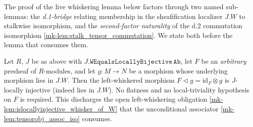 The proof of the live whiskering lemma below factors through two named
sub-lemmas: the \emph{d.1-bridge} relating membership in the sheafification
localizer \(J.W\) to stalkwise isomorphism, and the \emph{second-factor
naturality} of the d.2 commutation isomorphism \ref{mk-lem:stalk_tensor_commutation}.
We state both before the lemma that consumes them.

\begin{lemma}\label{mk-lem:islocallyinjective_whiskerleft_via_stalk}
  \leanok

  Let \(R\), \(J\) be as above with \(J.\mathtt{WEqualsLocallyBijective}\,\mathtt{Ab}\),
  let \(F\) be an \emph{arbitrary} presheaf of \(R\)-modules, and let \(g : M \to N\)
  be a morphism whose underlying morphism lies in \(J.W\). Then the left-whiskered
  morphism \(F \triangleleft g = \mathrm{id}_F \otimes g\) is \(J\)-locally injective
  (indeed lies in \(J.W\)). No flatness and no local-triviality hypothesis on \(F\) is
  required. This discharges the open left-whiskering obligation
  \ref{mk-lem:islocallyinjective_whisker_of_W} that the unconditional associator
  \ref{mk-lem:tensorobj_assoc_iso} consumes.
\end{lemma}
